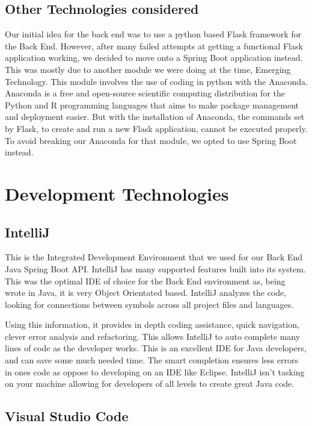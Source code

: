 \subsection{Other Technologies considered}
Our initial idea for the back end was to use a python based Flask framework for the Back End. However, after many failed attempts at getting a functional Flask application working, we decided to move onto a Spring Boot application instead. This was mostly due to another module we were doing at the time, Emerging Technology. This module involves the use of coding in python with the Anaconda. Anaconda is a free and open-source scientific computing distribution for the Python and R programming languages that aims to make package management and deployment easier. But with the installation of Anaconda, the commands set by Flask, to create and run a new Flask application, cannot be executed properly. To avoid breaking our Anaconda for that module, we opted to use Spring Boot instead. 

\section{Development Technologies}

\subsection{IntelliJ}
This is the Integrated Development Environment that we used for our Back End Java Spring Boot API. IntelliJ has many supported features built into its system. This was the optimal IDE of choice for the Back End environment as, being wrote in Java, it is very Object Orientated based. IntelliJ analyzes the code, looking for connections between symbols across all project files and languages.\par
Using this information, it provides in depth coding assistance, quick navigation, clever error analysis and refactoring. This allows IntelliJ to auto complete many lines of code as the developer works. This is an excellent IDE for Java developers, and can save some much needed time. The smart completion ensures less errors in ones code as oppose to developing on an IDE like Eclipse. IntelliJ isn't tasking on your machine allowing for developers of all levels to create great Java code.

\subsection{Visual Studio Code}

